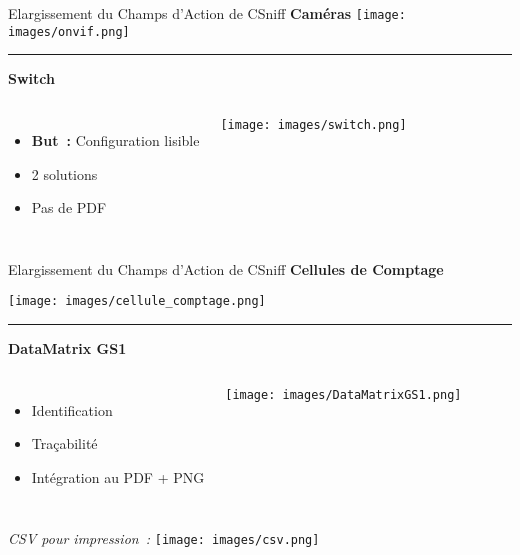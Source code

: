 \begin{frame}{Elargissement du Champs d'Action de CSniff}
    \vspace*{-0.45cm}
    \textbf{Caméras}
    \hspace*{-0.05\textwidth}
        \texttt{[image: images/onvif.png]}

        \vfill
        \hrule
        \vfill

        \textbf{Switch}
        \vspace*{0.1cm}
        \begin{columns}
            \begin{itemize}
                \item \textbf{But~:} Configuration lisible
                \item 2 solutions
                \item Pas de PDF
            \end{itemize}

            \texttt{[image: images/switch.png]}
        \end{columns}
        
    
\end{frame}

\begin{frame}{Elargissement du Champs d'Action de CSniff}
        \vspace*{-0.5cm}
        \textbf{Cellules de Comptage}
        \vspace*{-0.2cm}
        \begin{center}
            \texttt{[image: images/cellule\_comptage.png]}
        \end{center}

        \hrule
        \textbf{DataMatrix GS1}
        \begin{columns}
            \begin{itemize}
            \item Identification
            \item Traçabilité
            \item Intégration au PDF + PNG
        \end{itemize}
            
            \begin{center}
                \texttt{[image: images/DataMatrixGS1.png]}
            \end{center}
            
        \end{columns}
        \emph{CSV pour impression~:}
        \texttt{[image: images/csv.png]}
        
\end{frame}




